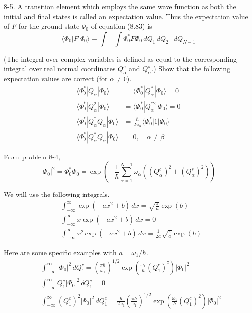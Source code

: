 \documentclass[12pt]{article}
\newcommand\U{\vert\Phi_0\vert^2}
\begin{document}
8-5.
A transition element which employs the same wave
function as both the initial and final states is called an expectation value.
Thus the expectation value of $F$ for the ground state $\Phi_0$ of
equation (8.83) is
\begin{equation*}
\langle\Phi_0|F|\Phi_0\rangle
=\int\cdots\int
\Phi_0^*F\Phi_0\,dQ_1\,dQ_2\cdots dQ_{N-1}
\tag{8.84}
\end{equation*}

(The integral over complex variables is defined as equal to the
corresponding integral over real normal coordinates $Q_\alpha^c$
and $Q_\alpha^s$.)
Show that the following expectation values are correct (for $\alpha\ne0$).
\begin{equation*}
\begin{aligned}
\langle\Phi_0^*|Q_\alpha|\Phi_0\rangle
&=\langle\Phi_0^*|Q_\alpha^*|\Phi_0\rangle=0
\\
\langle\Phi_0^*|Q_\alpha^2|\Phi_0\rangle
&=\langle\Phi_0^*|Q_\alpha^{*2}|\Phi_0\rangle=0
\\
\langle\Phi_0^*|Q_\alpha^*Q_\alpha|\Phi_0\rangle
&=\frac{\hbar}{2\omega_\alpha}\langle\Phi_0^*|1|\Phi_0\rangle
\\
\langle\Phi_0^*|Q_\alpha^*Q_\alpha|\Phi_0\rangle&=0,\quad\alpha\ne\beta
\end{aligned}
\tag{8.85}
\end{equation*}

From problem 8-4,
\begin{equation*}
\U
=\Phi_0^*\Phi_0
=\exp\left(
-\frac{1}{\hbar}
\sum_{\alpha=1}^{N-1}
\omega_\alpha\left((Q_\alpha^c)^2+(Q_\alpha^s)^2\right)
\right)
\end{equation*}

We will use the following integrals.
\begin{align*}
&\int_{-\infty}^\infty\exp(-ax^2+b)\,dx=\sqrt{\frac{\pi}{a}}\exp(b)
\tag{1}
\\
&\int_{-\infty}^\infty x\exp(-ax^2+b)\,dx=0
\tag{2}
\\
&\int_{-\infty}^\infty x^2\exp(-ax^2+b)\,dx=\frac{1}{2a}\sqrt{\frac{\pi}{a}}\exp(b)
\tag{3}
\end{align*}

Here are some specific examples with $a=\omega_1/\hbar$.
\begin{align*}
&\int_{-\infty}^\infty
\U\,dQ_1^c=\left(\frac{\pi\hbar}{\omega_1}\right)^{1/2}
\exp\left(\frac{\omega_1}{\hbar}(Q_1^c)^2\right)
\U
\tag{4}
\\
&\int_{-\infty}^\infty Q_1^c
\U\,dQ_1^c=0
\tag{5}
\\
&\int_{-\infty}^\infty (Q_1^c)^2
\U\,dQ_1^c
=\frac{\hbar}{2\omega_1}
\left(\frac{\pi\hbar}{\omega_1}\right)^{1/2}
\exp\left(\frac{\omega_1}{\hbar}(Q_1^c)^2\right)
\U
\tag{6}
\end{align*}
\end{document}
